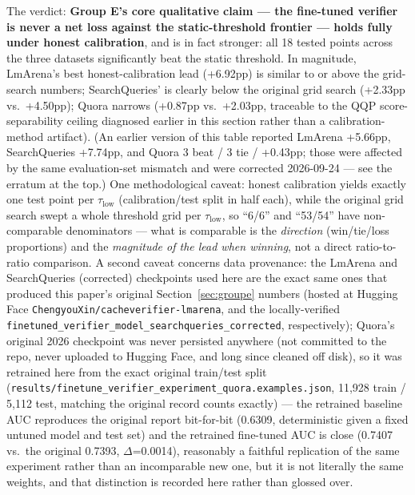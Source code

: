 \documentclass[11pt]{article}
\newcommand{\taulow}{\ensuremath{\tau_{\text{low}}}}
\begin{document}
The verdict: \textbf{Group E's core qualitative claim --- the fine-tuned verifier is never a net loss against the static-threshold frontier --- holds fully under honest calibration}, and is in fact stronger: all 18 tested points across the three datasets significantly beat the static threshold. In magnitude, LmArena's best honest-calibration lead (+6.92pp) is similar to or above the grid-search numbers; SearchQueries' is clearly below the original grid search (+2.33pp vs.\ +4.50pp); Quora narrows (+0.87pp vs.\ +2.03pp, traceable to the QQP score-separability ceiling diagnosed earlier in this section rather than a calibration-method artifact). (An earlier version of this table reported LmArena +5.66pp, SearchQueries +7.74pp, and Quora 3 beat / 3 tie / +0.43pp; those were affected by the same evaluation-set mismatch and were corrected 2026-09-24 --- see the erratum at the top.) One methodological caveat: honest calibration yields exactly one test point per $\taulow$ (calibration/test split in half each), while the original grid search swept a whole threshold grid per $\taulow$, so ``6/6'' and ``53/54'' have non-comparable denominators --- what is comparable is the \emph{direction} (win/tie/loss proportions) and the \emph{magnitude of the lead when winning}, not a direct ratio-to-ratio comparison. A second caveat concerns data provenance: the LmArena and SearchQueries (corrected) checkpoints used here are the exact same ones that produced this paper's original Section~\ref{sec:groupe} numbers (hosted at Hugging Face \texttt{Chengyou\allowbreak{}Xin/\allowbreak{}cacheverifier-lmarena}, and the locally-verified \texttt{finetuned\_\allowbreak{}verifier\_\allowbreak{}model\_\allowbreak{}searchqueries\_\allowbreak{}corrected}, respectively); Quora's original 2026 checkpoint was never persisted anywhere (not committed to the repo, never uploaded to Hugging Face, and long since cleaned off disk), so it was retrained here from the exact original train/test split (\texttt{results/\allowbreak{}finetune\_\allowbreak{}verifier\_\allowbreak{}experiment\_\allowbreak{}quora.\allowbreak{}examples.\allowbreak{}json}, 11,928 train / 5,112 test, matching the original record counts exactly) --- the retrained baseline AUC reproduces the original report bit-for-bit (0.6309, deterministic given a fixed untuned model and test set) and the retrained fine-tuned AUC is close (0.7407 vs.\ the original 0.7393, $\Delta$=0.0014), reasonably a faithful replication of the same experiment rather than an incomparable new one, but it is not literally the same weights, and that distinction is recorded here rather than glossed over.
\end{document}
